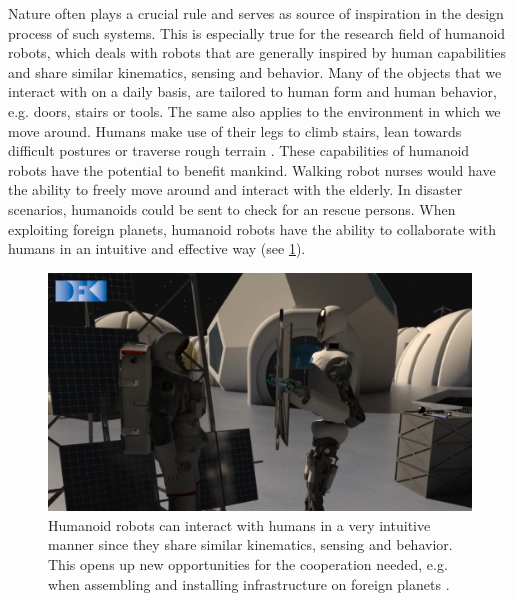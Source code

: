 Nature often plays a crucial rule and serves as source of inspiration in the design process of such systems. This is especially true for the research field of humanoid robots, which deals with robots that are generally inspired by human capabilities and share similar kinematics, sensing and behavior. Many of the objects that we interact with on a daily basis, are tailored to human form and human behavior, e.g. doors, stairs or tools. The same also applies to the environment in which we move around. Humans make use of their legs to climb stairs, lean towards difficult postures or traverse rough terrain \cite{fitzpatrick2016humanoids}. These capabilities of humanoid robots have the potential to benefit mankind. Walking robot nurses would have the ability to freely move around and interact with the elderly. In disaster scenarios, humanoids could be sent to check for an rescue persons. When exploiting foreign planets, humanoid robots have the ability to collaborate with humans in an intuitive and effective way (see \cref{img:rh5_interactive}).   
\begin{figure}[h!]
\centering	
\includegraphics[width=.7\textwidth]{img/intro/rh5_interactive_16_9}
\caption[Humanoid robots interact intuitively with humans]{Humanoid robots can interact with humans in a very intuitive manner since they share similar kinematics, sensing and behavior. This opens up new opportunities for the cooperation needed, e.g. when assembling and installing infrastructure on foreign planets \cite{img:rh5_interactive}.}
\label{img:rh5_interactive}
\end{figure} 
    
